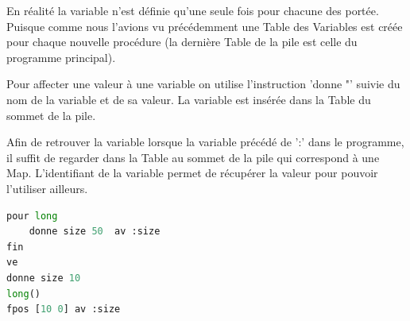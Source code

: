 \documentclass[a4paper,11pt]{article}
\begin{document}
En réalité la variable n'est définie qu'une seule fois pour chacune des portée. Puisque comme nous l'avions vu précédemment une Table des Variables est créée pour chaque nouvelle procédure (la dernière Table de la pile est celle du programme principal).

Pour affecter une valeur à une variable on utilise l'instruction 'donne "' suivie du nom de la variable et de sa valeur. La variable est insérée dans la Table du sommet de la pile.

Afin de retrouver la variable lorsque la variable précédé de ':' dans le programme, il suffit de regarder dans la Table au sommet de la pile qui correspond à une Map. 
L'identifiant de la variable permet de récupérer la valeur pour pouvoir l'utiliser ailleurs.
\begin{lstlisting}[language=Python]
pour long
	donne size 50  av :size
fin
ve
donne size 10 
long() 
fpos [10 0] av :size
\end{lstlisting}
\end{document}
